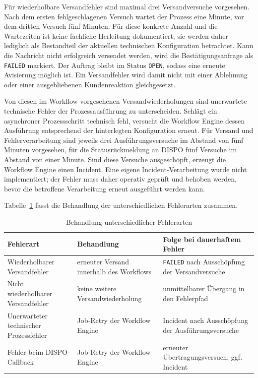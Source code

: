 \documentclass[
  12pt,
  a4paper,
  oneside
]{article}
\begin{document}
Für wiederholbare Versandfehler sind maximal drei Versandversuche vorgesehen.
Nach dem ersten fehlgeschlagenen Versuch wartet der Prozess eine Minute, vor
dem dritten Versuch fünf Minuten. Für diese konkrete Anzahl und die Wartezeiten
ist keine fachliche Herleitung dokumentiert; sie werden daher lediglich als
Bestandteil der aktuellen technischen Konfiguration betrachtet. Kann die
Nachricht nicht erfolgreich versendet werden, wird die
Bestätigungsanfrage als \texttt{FAILED} markiert. Der Auftrag bleibt im
Status \texttt{OPEN}, sodass eine erneute Avisierung möglich ist. Ein
Versandfehler wird damit nicht mit einer Ablehnung oder einer ausgebliebenen
Kundenreaktion gleichgesetzt.

Von diesen im Workflow vorgesehenen Versandwiederholungen sind unerwartete
technische Fehler der Prozessausführung zu unterscheiden. Schlägt ein
asynchroner Prozessschritt technisch fehl, versucht die Workflow Engine dessen
Ausführung entsprechend der hinterlegten Konfiguration erneut. Für Versand und
Fehlerverarbeitung sind jeweils drei Ausführungsversuche im Abstand von fünf
Minuten vorgesehen, für die Statusrückmeldung an DISPO fünf Versuche im Abstand
von einer Minute. Sind diese Versuche ausgeschöpft, erzeugt die Workflow Engine
einen Incident. Eine eigene Incident-Verarbeitung wurde nicht implementiert; der
Fehler muss daher operativ geprüft und behoben werden, bevor die betroffene
Verarbeitung erneut ausgeführt werden kann.

Tabelle~\ref{tab:fehlerbehandlung} fasst die Behandlung der unterschiedlichen
Fehlerarten zusammen.

\begin{table}[htbp]
  \centering
  \caption{Behandlung unterschiedlicher Fehlerarten}
  \label{tab:fehlerbehandlung}
  \small
  \setlength{\tabcolsep}{5pt}
  \begin{tabularx}{\textwidth}{
      @{}
      >{\raggedright\arraybackslash}p{}
      >{\raggedright\arraybackslash}p{}
      >{\raggedright\arraybackslash}X
      @{}
    }
    \toprule
    Fehlerart
      & Behandlung
      & Folge bei dauerhaftem Fehler \\
    \midrule
    Wiederholbarer Versandfehler
      & erneuter Versand innerhalb des Workflows
      & \texttt{FAILED} nach Ausschöpfung der Versandversuche \\
    Nicht wiederholbarer Versandfehler
      & keine weitere Versandwiederholung
      & unmittelbarer Übergang in den Fehlerpfad \\
    Unerwarteter technischer Prozessfehler
      & Job-Retry der Workflow Engine
      & Incident nach Ausschöpfung der Ausführungsversuche \\
    Fehler beim DISPO-Callback
      & Job-Retry der Workflow Engine
      & erneuter Übertragungsversuch, ggf. Incident \\
    \bottomrule
  \end{tabularx}
\end{table}
\end{document}
